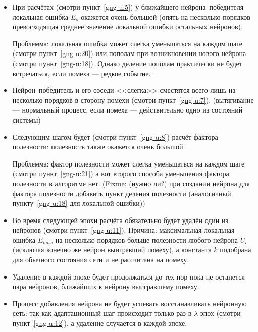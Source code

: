 \documentclass[unicode, 12pt, a4paper,oneside,fleqn]{article}
\begin{document}
\begin{enumerate}
{\begin{minipage}{\linewidth-2cm}
      \begin{itemize}
      \item При расчётах (смотри пункт~\ref{gng-u:5}) у ближайшего
        нейрона--победителя локальная ошибка $E_s$ окажется очень
        большой (опять на несколько порядков превосходящая среднее
        значение локальной ошибки остальных нейронов).

        Проблемма: локальная ошибка может слегка уменьшаться на каждом
        шаге (смотри пункт~\ref{gng-u:20}) или пополам при
        возникновении нового нейрона (смотри
        пункт~\ref{gng-u:18}). Однако деление пополам практически не
        будет встречаться, если помеха --- редкое событие.
      \item Нейрон--победитель и его соседи <<слегка>> сместятся всего
        лишь на несколько порядков в сторону помехи (смотри
        пункт~\ref{gng-u:7}). (вытягивание --- нормальный процесс,
        если помеха --- действительно одно из состояний системы)
      \item Следующим шагом будет (смотри пункт~\ref{gng-u:8}) расчёт
        фактора полезности: полезность также окажется очень большой.

        Проблемма: фактор полезности может слегка уменьшаться на
        каждом шаге (смотри пункт~\ref{gng-u:21}) а вот второго
        способа уменьшения фактора полезности в алгоритме нет.
        (Fixme: (нужно ли?) при создании нейрона для фактора
        полезности добавить пункт деления полезности (аналогичный
        пункту~\ref{gng-u:18} для локальной ошибки))
      \item Во время следующей эпохи расчёта обязательно будет удалён
        один из нейронов (смотри пункт~\ref{gng-u:11}). Причина:
        максимальная локальная ошибка $E_{max}$ на несколько порядков
        больше полезности любого нейрона $U_i$ (исключая конечно же
        нейрон выигравший помеху), а константа $k$ подобрана для
        обычного состояния сети и не рассчитана на помеху.
      \item Удаление в каждой эпохе будет продолжаться до тех пор пока
        не останется пара нейронов, ближайших к нейрону выигравшему
        помеху.
      \item Процесс добавления нейрона не будет успевать
        восстанавливать нейронную сеть: так как адаптационный шаг
        происходит только раз в $\lambda$ эпох (смотри
        пункт~\ref{gng-u:12}), а удаление случается в каждой эпохе.
      \end{itemize}


\end{minipage}}
\end{enumerate}
\end{document}
